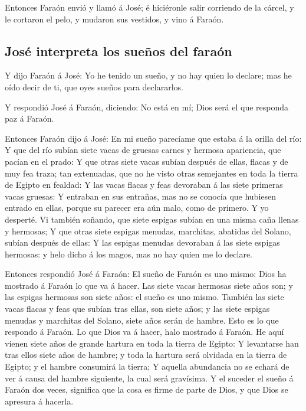  Entonces Faraón envió y llamó á José; é hiciéronle salir
corriendo de la cárcel, y le cortaron el pelo, y mudaron sus vestidos, y
vino á Faraón.

\hypertarget{josuxe9-interpreta-los-sueuxf1os-del-farauxf3n}{%
\subsection{José interpreta los sueños del
faraón}\label{josuxe9-interpreta-los-sueuxf1os-del-farauxf3n}}

 Y dijo Faraón á José: Yo he tenido un sueño, y no hay
quien lo declare; mas he oído decir de ti, que oyes sueños para
declararlos.

 Y respondió José á Faraón, diciendo: No está en mí; Dios
será el que responda paz á Faraón.

 Entonces Faraón dijo á José: En mi sueño parecíame que
estaba á la orilla del río:  Y que del río subían siete
vacas de gruesas carnes y hermosa apariencia, que pacían en el prado:
 Y que otras siete vacas subían después de ellas, flacas
y de muy fea traza; tan extenuadas, que no he visto otras semejantes en
toda la tierra de Egipto en fealdad:  Y las vacas flacas
y feas devoraban á las siete primeras vacas gruesas:  Y
entraban en sus entrañas, mas no se conocía que hubiesen entrado en
ellas, porque su parecer era aún malo, como de primero. Y yo desperté.
 Vi también soñando, que siete espigas subían en una
misma caña llenas y hermosas;  Y que otras siete espigas
menudas, marchitas, abatidas del Solano, subían después de ellas:
 Y las espigas menudas devoraban á las siete espigas
hermosas: y helo dicho á los magos, mas no hay quien me lo declare.

 Entonces respondió José á Faraón: El sueño de Faraón es
uno mismo: Dios ha mostrado á Faraón lo que va á hacer. 
Las siete vacas hermosas siete años son; y las espigas hermosas son
siete años: el sueño es uno mismo.  También las siete
vacas flacas y feas que subían tras ellas, son siete años; y las siete
espigas menudas y marchitas del Solano, siete años serán de hambre.
 Esto es lo que respondo á Faraón. Lo que Dios va á
hacer, halo mostrado á Faraón.  He aquí vienen siete años
de grande hartura en toda la tierra de Egipto:  Y
levantarse han tras ellos siete años de hambre; y toda la hartura será
olvidada en la tierra de Egipto; y el hambre consumirá la tierra;
 Y aquella abundancia no se echará de ver á causa del
hambre siguiente, la cual será gravísima.  Y el suceder
el sueño á Faraón dos veces, significa que la cosa es firme de parte de
Dios, y que Dios se apresura á hacerla.

